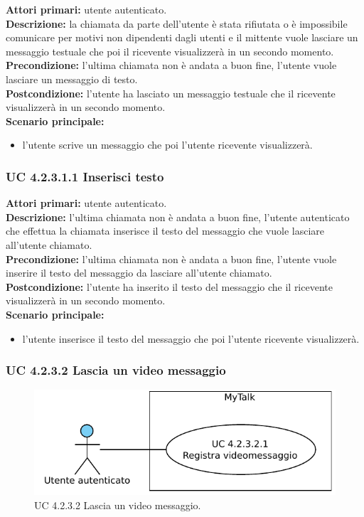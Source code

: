 \noindent
\textbf{Attori primari:} utente autenticato.\\
\textbf{Descrizione:} la chiamata da parte dell'utente è stata rifiutata o è impossibile comunicare per motivi non dipendenti dagli utenti e il mittente vuole lasciare un messaggio testuale che poi il ricevente visualizzerà in un secondo momento.\\
\textbf{Precondizione:} l'ultima chiamata non è andata a buon fine, l'utente vuole lasciare un messaggio di testo.\\
\textbf{Postcondizione:} l'utente ha lasciato un messaggio testuale che il ricevente visualizzerà in un secondo momento.\\
\textbf{Scenario principale:}
\begin{itemize}
\item l'utente scrive un messaggio che poi l'utente ricevente visualizzerà.
\end{itemize}

\subsubsection{UC 4.2.3.1.1 Inserisci testo}
\noindent
\textbf{Attori primari:} utente autenticato.\\
\textbf{Descrizione:} l'ultima chiamata non è andata a buon fine, l'utente autenticato che effettua la chiamata inserisce il testo del messaggio che vuole lasciare all'utente chiamato.\\
\textbf{Precondizione:} l'ultima chiamata non è andata a buon fine, l'utente vuole inserire il testo del messaggio da lasciare all'utente chiamato.\\
\textbf{Postcondizione:} l'utente ha inserito il testo del messaggio che il ricevente visualizzerà in un secondo momento.\\
\textbf{Scenario principale:}
\begin{itemize}
\item l'utente inserisce il testo del messaggio che poi l'utente ricevente visualizzerà.
\end{itemize}

\subsubsection{UC 4.2.3.2 Lascia un video messaggio }

\begin{figure}[htbp]
\centering
\includegraphics[scale=0.7]{./casi_uso/UC4-2-3-2.pdf}
\caption{UC 4.2.3.2 Lascia un video messaggio.}
\end{figure}

